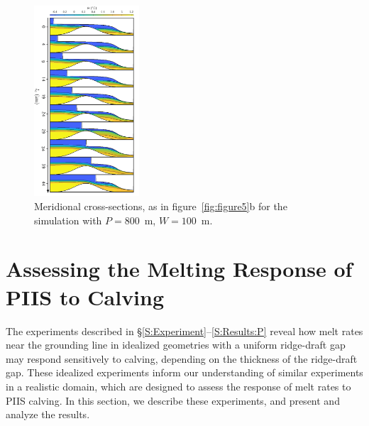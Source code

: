 \documentclass[draft]{agujournal2019}
\begin{document}
\begin{figure}
    \centering
    \includegraphics[width = 0.35\textwidth]{plots/figure9.pdf}
    \caption{Meridional cross-sections, as in figure~\ref{fig:figure5}b for the simulation with $P=800$~m, $W=100$~m. }
    \label{fig:figure9}
\end{figure}

\section{Assessing the Melting Response of PIIS to Calving}\label{S:Realistic}
The experiments described in \S\ref{S:Experiment}--\ref{S:Results:P} reveal how melt rates near the grounding line in idealized geometries with a uniform ridge-draft gap may respond sensitively to calving, depending on the thickness of the ridge-draft gap. These idealized experiments inform our understanding of similar experiments in a realistic domain, which are designed to assess the response of melt rates to PIIS calving. In this section, we describe these experiments, and present and analyze the results.
\end{document}
